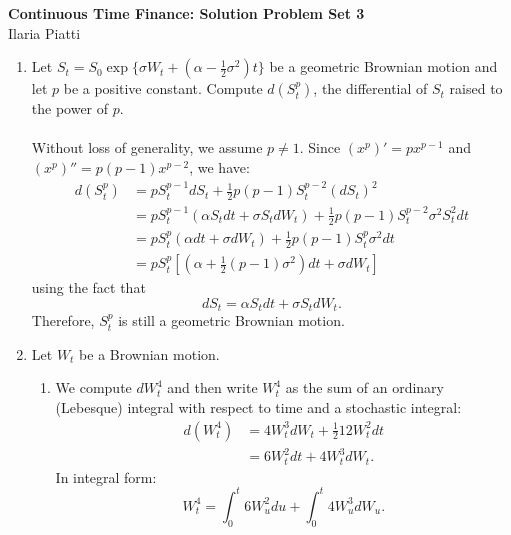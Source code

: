 \documentclass[11pt,a4,table]{article}
\begin{document}
\vspace*{-0.7in}

\begin{center}
 \textbf{Continuous Time Finance: Solution Problem Set 3} \\
Ilaria Piatti
\end{center} 


\begin{enumerate}
    \item Let $S_t=S_0\exp\{\sigma W_t+(\alpha - \frac{1}{2}\sigma^2)t\}$ be a geometric Brownian motion and let $p$ be a positive constant. Compute $d(S_t^p)$, the differential of $S_t$ raised to the power of $p$.\\
    \\
    Without loss of generality, we assume $p \neq 1 $. Since $(x^p)'=px^{p-1}$ and $(x^p)''=p(p-1)x^{p-2}$, we have:
    \begin{align*}
        d(S_t^p) &= pS_t^{p-1} dS_t + \frac{1}{2}p(p-1)S_t^{p-2} (dS_t)^2\\
        &= pS_t^{p-1}(\alpha S_t dt + \sigma S_t dW_t) +\frac{1}{2}p(p-1)S_t^{p-2}\sigma^2 S_t^2 dt\\
        &= pS_t^p(\alpha dt + \sigma dW_t) + \frac{1}{2}p(p-1)S_t^p\sigma^2 dt\\
        &= pS_t^p \left[(\alpha + \frac{1}{2}(p-1)\sigma^2) dt + \sigma dW_t \right]
    \end{align*}
    using the fact that
    \begin{equation*}
        dS_t = \alpha S_t dt + \sigma S_t dW_t.
    \end{equation*}
    Therefore, $S_t^p$ is still a geometric Brownian motion.
    
    \item Let $W_t$ be a Brownian motion.
    
    \begin{enumerate}
        \item We compute $dW_t^4$ and then write $W_t^4$ as the sum of an ordinary (Lebesque) integral with respect to time and a stochastic integral:
        \begin{align*}
            d(W_t^4) &= 4W_t^3 dW_t + \frac{1}{2}12W_t^2 dt\\
            &= 6W_t^2 dt + 4W_t^3 dW_t.
        \end{align*}
        In integral form:
        \begin{equation*}
            W_t^4 = \int_0^t 6W_u^2 du + \int_0^t 4W_u^3 dW_u.
        \end{equation*}
        

\end{enumerate}
\end{enumerate}
\end{document}
